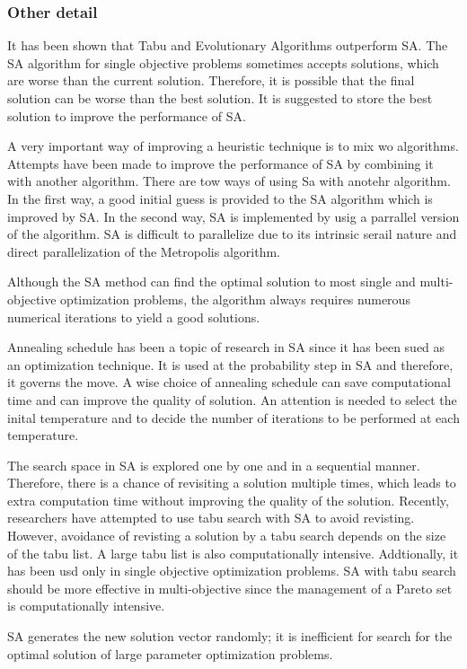 \documentclass[pdftex,11pt]{article}
\begin{document}
\subsubsection{Other detail}
It has been shown that Tabu and Evolutionary Algorithms outperform SA. The SA algorithm for single objective problems sometimes accepts solutions, which are worse than the current solution. Therefore, it is possible that the final solution can be worse than the best solution. It is suggested to store the best solution to improve the performance of SA.

A very important way of improving a heuristic technique is to mix wo algorithms. Attempts have been made to improve the performance of SA by combining it with another algorithm. There are tow ways of using Sa with anotehr algorithm. In the first way, a good initial guess is provided to the SA algorithm which is improved by SA. In the second way, SA is implemented by usig a parrallel version of the algorithm. SA is difficult to parallelize due to its intrinsic serail nature and direct parallelization of the Metropolis algorithm.

Although the SA method can find the optimal solution to most single and multi-objective optimization problems, the algorithm always requires numerous numerical iterations to yield a good solutions.

Annealing schedule has been a topic of research in SA since it has been sued as an optimization technique. It is used at the probability step in SA and therefore, it governs the move. A wise choice of annealing schedule can save computational time and can improve the quality of solution. An attention is needed to select the inital temperature and to decide the number of iterations to be performed at each temperature.

The search space in SA is explored one by one and in a sequential manner. Therefore, there is a chance of revisiting a solution multiple times, which leads to extra computation time without improving the quality of the solution. Recently, researchers have attempted to use tabu search with SA to avoid revisting. However, avoidance of revisting a solution by a tabu search depends on the size of the tabu list. A large tabu list is also computationally intensive. Addtionally, it has been usd only in single objective optimization problems. SA with tabu search should be more effective in multi-objective since the management of a Pareto set is computationally intensive.

SA generates the new solution vector randomly; it is inefficient for search for the optimal solution of large parameter optimization problems. 
\end{document}
